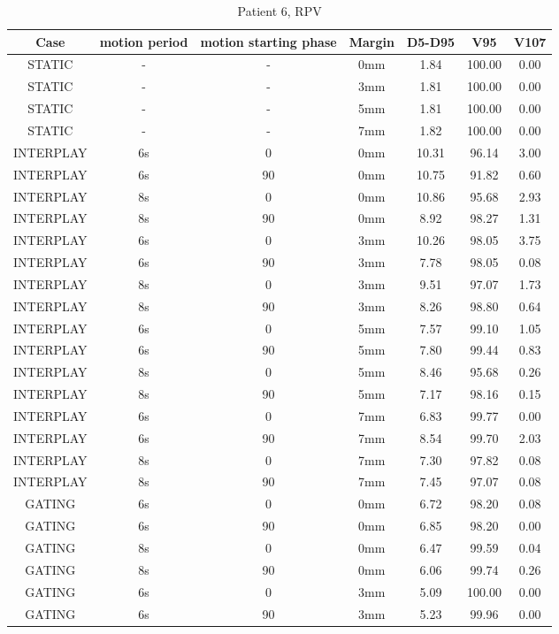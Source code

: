\begin{table}[H]
  \centering
  \caption{Patient 6, RPV}
  \begin{tabular}{|c||c|c|c||c|c|c|}
    \hline\hline
    Case & motion period & motion starting phase & Margin & D5-D95 & V95 & V107\\
    \hline 
STATIC & - & - & 0mm & 1.84 & 100.00 & 0.00 \\
STATIC & - & - & 3mm & 1.81 & 100.00 & 0.00 \\
STATIC & - & - & 5mm & 1.81 & 100.00 & 0.00 \\
STATIC & - & - & 7mm & 1.82 & 100.00 & 0.00 \\
INTERPLAY & 6s & 0 & 0mm & 10.31 & 96.14 & 3.00 \\
INTERPLAY & 6s & 90 & 0mm & 10.75 & 91.82 & 0.60 \\
INTERPLAY & 8s & 0 & 0mm & 10.86 & 95.68 & 2.93 \\
INTERPLAY & 8s & 90 & 0mm & 8.92 & 98.27 & 1.31 \\
INTERPLAY & 6s & 0 & 3mm & 10.26 & 98.05 & 3.75 \\
INTERPLAY & 6s & 90 & 3mm & 7.78 & 98.05 & 0.08 \\
INTERPLAY & 8s & 0 & 3mm & 9.51 & 97.07 & 1.73 \\
INTERPLAY & 8s & 90 & 3mm & 8.26 & 98.80 & 0.64 \\
INTERPLAY & 6s & 0 & 5mm & 7.57 & 99.10 & 1.05 \\
INTERPLAY & 6s & 90 & 5mm & 7.80 & 99.44 & 0.83 \\
INTERPLAY & 8s & 0 & 5mm & 8.46 & 95.68 & 0.26 \\
INTERPLAY & 8s & 90 & 5mm & 7.17 & 98.16 & 0.15 \\
INTERPLAY & 6s & 0 & 7mm & 6.83 & 99.77 & 0.00 \\
INTERPLAY & 6s & 90 & 7mm & 8.54 & 99.70 & 2.03 \\
INTERPLAY & 8s & 0 & 7mm & 7.30 & 97.82 & 0.08 \\
INTERPLAY & 8s & 90 & 7mm & 7.45 & 97.07 & 0.08 \\
GATING & 6s & 0 & 0mm & 6.72 & 98.20 & 0.08 \\
GATING & 6s & 90 & 0mm & 6.85 & 98.20 & 0.00 \\
GATING & 8s & 0 & 0mm & 6.47 & 99.59 & 0.04 \\
GATING & 8s & 90 & 0mm & 6.06 & 99.74 & 0.26 \\
GATING & 6s & 0 & 3mm & 5.09 & 100.00 & 0.00 \\
GATING & 6s & 90 & 3mm & 5.23 & 99.96 & 0.00 \\

\end{tabular}
\end{table}
